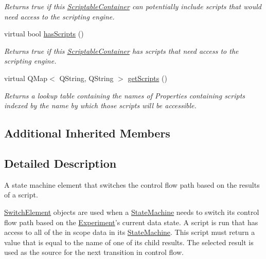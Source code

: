 \begin{DoxyCompactItemize}
\begin{DoxyCompactList}\small\item\em Returns true if this \hyperlink{class_picto_1_1_scriptable_container}{Scriptable\-Container} can potentially include scripts that would need access to the scripting engine. \end{DoxyCompactList}\item 
virtual bool \hyperlink{class_picto_1_1_switch_element_a922a7a3a109d7d64dd51456a4c180995}{has\-Scripts} ()
\begin{DoxyCompactList}\small\item\em Returns true if this \hyperlink{class_picto_1_1_scriptable_container}{Scriptable\-Container} has scripts that need access to the scripting engine. \end{DoxyCompactList}\item 
virtual Q\-Map$<$ Q\-String, Q\-String $>$ \hyperlink{class_picto_1_1_switch_element_ada1e29453548af292d1fb1b6db02b64e}{get\-Scripts} ()
\begin{DoxyCompactList}\small\item\em Returns a lookup table containing the names of Properties containing scripts indexed by the name by which those scripts will be accessible. \end{DoxyCompactList}\end{DoxyCompactItemize}
\subsection*{Additional Inherited Members}


\subsection{Detailed Description}
A state machine element that switches the control flow path based on the results of a script. 

\hyperlink{class_picto_1_1_switch_element}{Switch\-Element} objects are used when a \hyperlink{class_picto_1_1_state_machine}{State\-Machine} needs to switch its control flow path based on the \hyperlink{class_picto_1_1_experiment}{Experiment}'s current data state. A script is run that has access to all of the in scope data in its \hyperlink{class_picto_1_1_state_machine}{State\-Machine}. This script must return a value that is equal to the name of one of its child results. The selected result is used as the source for the next transition in control flow.

